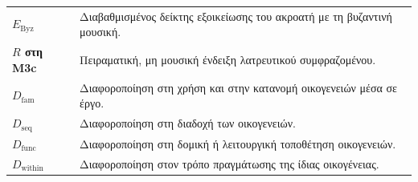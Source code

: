 \documentclass[11pt,a4paper]{extarticle}
\begin{document}
\begin{longtable}{>{\bfseries}p{4.0cm}p{10.7cm}}
\(E_{\mathrm{Byz}}\) & Διαβαθμισμένος δείκτης εξοικείωσης του ακροατή με τη βυζαντινή μουσική. \\
\(R\) στη M3c & Πειραματική, μη μουσική ένδειξη λατρευτικού συμφραζομένου. \\
\(D_{\mathrm{fam}}\) & Διαφοροποίηση στη χρήση και στην κατανομή οικογενειών μέσα σε έργο. \\
\(D_{\mathrm{seq}}\) & Διαφοροποίηση στη διαδοχή των οικογενειών. \\
\(D_{\mathrm{func}}\) & Διαφοροποίηση στη δομική ή λειτουργική τοποθέτηση οικογενειών. \\
\(D_{\mathrm{within}}\) & Διαφοροποίηση στον τρόπο πραγμάτωσης της ίδιας οικογένειας. \\
\bottomrule
\end{longtable}
\normalsize
\end{document}
